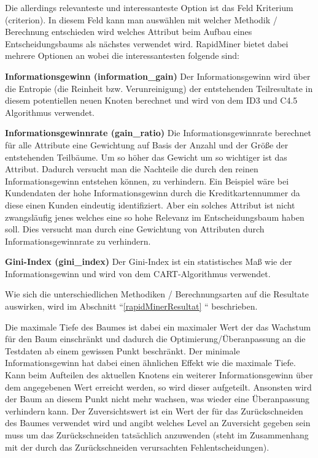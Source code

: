 Die allerdings relevanteste und interessanteste Option ist das Feld Kriterium (criterion). In diesem Feld kann man auswählen mit welcher Methodik / Berechnung entschieden wird welches Attribut beim Aufbau eines Entscheidungsbaums als nächstes verwendet wird. RapidMiner bietet dabei mehrere Optionen an wobei die interessantesten folgende sind:

\begin{pitemize}
\item \textbf{Informationsgewinn (information\_gain)} Der Informationsgewinn wird über die Entropie (die Reinheit bzw. Verunreinigung) der entstehenden Teilresultate in diesem potentiellen neuen Knoten berechnet und wird von dem ID3 und C4.5 Algorithmus verwendet.
\item \textbf{Informationsgewinnrate (gain\_ratio)} Die Informationsgewinnrate berechnet für alle Attribute eine Gewichtung auf Basis der Anzahl und der Größe der entstehenden Teilbäume. Um so höher das Gewicht um so wichtiger ist das Attribut. Dadurch versucht man die Nachteile die durch den reinen Informationsgewinn entstehen können, zu verhindern. Ein Beispiel wäre bei Kundendaten der hohe Informationsgewinn durch die Kreditkartennummer da diese einen Kunden eindeutig identifiziert. Aber ein solches Attribut ist nicht zwangsläufig jenes welches eine so hohe Relevanz im Entscheidungsbaum haben soll. Dies versucht man durch eine Gewichtung von Attributen durch Informationsgewinnrate zu verhindern. \cite{rapidminer_rapidminer_2015} \cite{johannes_furnkranz_decision-tree_2008}
\item \textbf{Gini-Index (gini\_index)} Der Gini-Index ist ein statistisches Maß wie der Informationsgewinn und wird von dem CART-Algorithmus verwendet.
\end{pitemize}

Wie sich die unterschiedlichen Methodiken / Berechnungsarten auf die Resultate auswirken, wird im Abschnitt ``\ref{rapidMinerResultat} `` beschrieben.

Die maximale Tiefe des Baumes ist dabei ein maximaler Wert der das Wachstum für den Baum einschränkt und dadurch die Optimierung/Überanpassung an die Testdaten ab einem gewissen Punkt beschränkt. Der minimale Informationsgewinn hat dabei einen ähnlichen Effekt wie die maximale Tiefe. Kann beim Aufteilen des aktuellen Knotens ein weiterer Informationsgewinn über dem angegebenen Wert erreicht werden, so wird dieser aufgeteilt. Ansonsten wird der Baum an diesem Punkt nicht mehr wachsen, was wieder eine Überanpassung verhindern kann. Der Zuversichtswert ist ein Wert der für das Zurückschneiden des Baumes verwendet wird und angibt welches Level an Zuversicht gegeben sein muss  um das Zurückschneiden tatsächlich anzuwenden (steht im Zusammenhang mit der durch das Zurückschneiden verursachten Fehlentscheidungen). \cite{rapidminer_rapidminer_2015}

